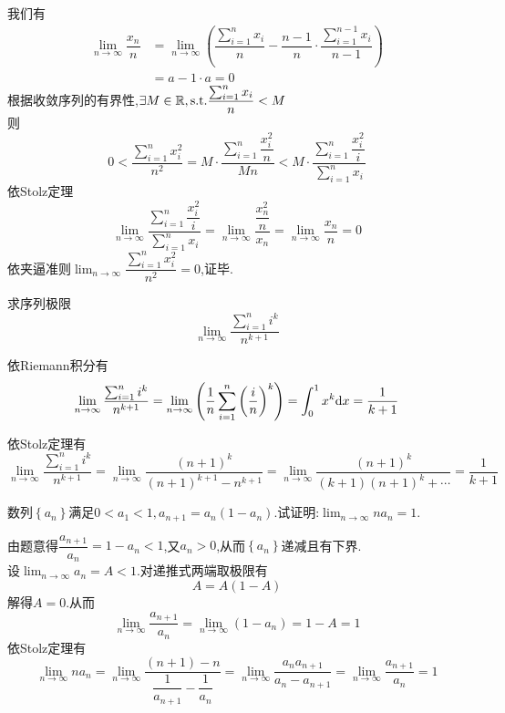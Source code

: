 \documentclass[a4paper]{ctexart}
\begin{document}
\begin{solution}[Proof.]
    我们有
    \begin{align*}
    \lim_{n\to\infty}{\dfrac{x_n}{n}} 
    &= \lim_{n\to\infty}{\left(\dfrac{\sum_{i=1}^{n}{x_i}}{n}-\dfrac{n-1}{n}\cdot\dfrac{\sum_{i=1}^{n-1}{x_i}}{n-1}\right)} \\
    &= a-1\cdot a= 0
    \end{align*}
    根据收敛序列的有界性,$\exists M\in\mathbb{R},\text{s.t.}\dfrac{\sum_{i=1}^{n}{x_i}}{n}<M$\\
    则$$0<\dfrac{\sum_{i=1}^{n}{x_i^2}}{n^2}=M\cdot\dfrac{\sum_{i=1}^{n}{\dfrac{x_i^2}{n}}}{Mn}<M\cdot\dfrac{\sum_{i=1}^{n}{\dfrac{x_i^2}{i}}}{\sum_{i=1}^{n}{x_i}}$$
    依Stolz定理$$\lim_{n\to\infty}{\dfrac{\sum_{i=1}^{n}{\dfrac{x_i^2}{i}}}{\sum_{i=1}^{n}{x_i}}}=\lim_{n\to\infty}{\dfrac{\dfrac{x_n^2}{n}}{x_n}}=\lim_{n\to\infty}{\dfrac{x_n}{n}}=0$$
    依夹逼准则$\displaystyle\lim_{n\to\infty}{\dfrac{\sum_{i=1}^{n}{x_i^2}}{n^2}}=0$,证毕.\\
\end{solution}
\begin{problem}[Problem 2.]
    求序列极限$$\lim_{n\to\infty}{\dfrac{\sum_{i=1}^n{i^k}}{n^{k+1}}}$$
\end{problem}
\begin{solution}
    依Riemann积分有$$\lim_{n\to\infty}{\dfrac{\sum_{i=1}^n{i^k}}{n^{k+1}}}=\lim_{n\to\infty}{\left(\dfrac{1}{n}\sum_{i=1}^{n}{\left(\dfrac{i}{n}\right)^k}\right)}=\int_0^1{x^k\mathrm{d} x}=\dfrac{1}{k+1}$$
\end{solution}
\begin{solution}
    依Stolz定理有$$\lim_{n\to\infty}{\dfrac{\sum_{i=1}^n{i^k}}{n^{k+1}}}=\lim_{n\to\infty}{\dfrac{(n+1)^k}{(n+1)^{k+1}-n^{k+1}}}=\lim_{n\to\infty}{\dfrac{(n+1)^k}{(k+1)(n+1)^k+\cdots}}=\dfrac{1}{k+1}$$
\end{solution}
\begin{problem}[Problem 3.]
    数列$\left\{a_n\right\}$满足$0<a_1<1,a_{n+1}=a_n(1-a_n)$.试证明:$\displaystyle\lim_{n\to\infty}na_n=1.$
\end{problem}
\begin{solution}[Proof.]
    由题意得$\dfrac{a_{n+1}}{a_n}=1-a_n<1$,又$a_n>0$,从而$\left\{a_n\right\}$递减且有下界.\\
    设$\displaystyle\lim_{n\to\infty}a_n=A<1$.对递推式两端取极限有$$A=A(1-A)$$
    解得$A=0$.从而
    $$\lim_{n\to\infty}\dfrac{a_{n+1}}{a_n}=\lim_{n\to\infty}(1-a_n)=1-A=1$$
    依Stolz定理有
    $$\lim_{n\to\infty}{na_n}=\lim_{n\to\infty}\dfrac{(n+1)-n}{\dfrac{1}{a_{n+1}}-\dfrac{1}{a_n}}=\lim_{n\to\infty}\dfrac{a_na_{n+1}}{a_n-a_{n+1}}=\lim_{n\to\infty}\dfrac{a_{n+1}}{a_n}=1$$
\end{solution}
\end{document}

